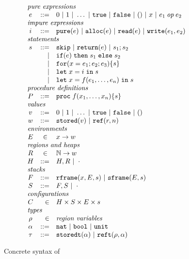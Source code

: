 \newcommand{\syntaxtitle}[1]{\multicolumn{3}{l}{\textit{#1}}}
\begin{figure}[t]

\[
\begin{array}{crl}
\syntaxtitle{pure expressions}\\
e & ::= & 0 \sep{} 1 \sep{} \ldots{} \sep{} \texttt{true} \sep{} \texttt{false} \sep{} () \sep{} x \sep{} 
          e_1 \mathbin{\mathit{op}} e_2 \\
\syntaxtitle{impure expressions}\\
i & ::= & \texttt{pure}(e) \sep{} \texttt{alloc}(e) \sep{}
          \texttt{read}(e) \sep{} \texttt{write}(e_1, e_2)\\
\syntaxtitle{statements}\\
s & ::= & \texttt{skip} \sep{} \texttt{return}(e) \sep{} s_1; s_2 \\ 
  & |   & \texttt{if}(e)\texttt{\;then\;} s_1 \texttt{\;else\;} s_2 \\
  & |   & \texttt{for}(x = e_1; e_2; e_3) \{ s \} \\
  & |   & \texttt{let\;} x = i \texttt{\;in\;} s \\
  & |   & \texttt{let\;} x = f(e_1, \ldots{}, e_n) \texttt{\;in\;} s \\
\syntaxtitle{procedure definitions}\\
P & ::= & \texttt{proc\;} f(x_1, \ldots{}, x_n) \{ s \}
\\
\syntaxtitle{values}\\
v & ::= & 0 \sep{} 1 \sep{} \ldots{} \sep{} \texttt{true} \sep{} \texttt{false} \sep{} () \\
w & ::= & \texttt{stored}(v) \sep{} \texttt{ref}(r, n) \\
\syntaxtitle{environments}\\
E & \in{} & x \to w \\
\syntaxtitle{regions and heaps}\\
R & \in{} & \mathbb{N} \to w\\
H & ::=   & H, R \sep{} \cdot{}\\
\syntaxtitle{stacks}\\
F & ::= & \texttt{rframe}(x, E, s) \sep{} \texttt{sframe}(E, s) \\
S & ::= & F, S \sep{} \cdot{} \\
\syntaxtitle{configurations}\\
C & \in & H \times S \times E \times s\\
\syntaxtitle{types}\\
\rho   & \in & \textit{region variables}\\
\alpha & ::= & \texttt{nat} \sep{} \texttt{bool} \sep{} \texttt{unit} \\
\tau   & ::= & \texttt{storedt}(\alpha) \sep{} \texttt{reft}(\rho, \alpha)
\end{array}
\]


\label{fig:syntax}
\caption{Concrete syntax of \coreivory{}}
\end{figure}

